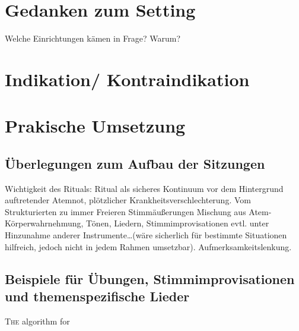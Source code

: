 \section{Gedanken zum Setting}
Welche Einrichtungen kämen in Frage? Warum? 

\section{Indikation/ Kontraindikation}

\section{Prakische Umsetzung}
\subsection{Überlegungen zum Aufbau der Sitzungen}
Wichtigkeit des Rituals: Ritual als sicheres Kontinuum vor dem Hintergrund auftretender Atemnot, plötzlicher Krankheitsverschlechterung. 
Vom Strukturierten zu immer Freieren Stimmäußerungen
Mischung aus Atem- Körperwahrnehmung, Tönen, Liedern, Stimmimprovisationen evtl. unter Hinzunahme anderer Instrumente…(wäre sicherlich für bestimmte Situationen hilfreich, jedoch nicht in jedem Rahmen umsetzbar). 
Aufmerksamkeitslenkung. 

\subsection{Beispiele für Übungen, Stimmimprovisationen und themenspezifische Lieder}



\ifpdf
    \graphicspath{{5_konzept/figures/PNG/}{5_konzept/figures/PDF/}{5_konzept/figures/}}
\else
    \graphicspath{{5_konzept/figures/EPS/}{5_konzept/figures/}}
\fi

\lettrine{T}{he} algorithm for

\newpage\thispagestyle{empty}
